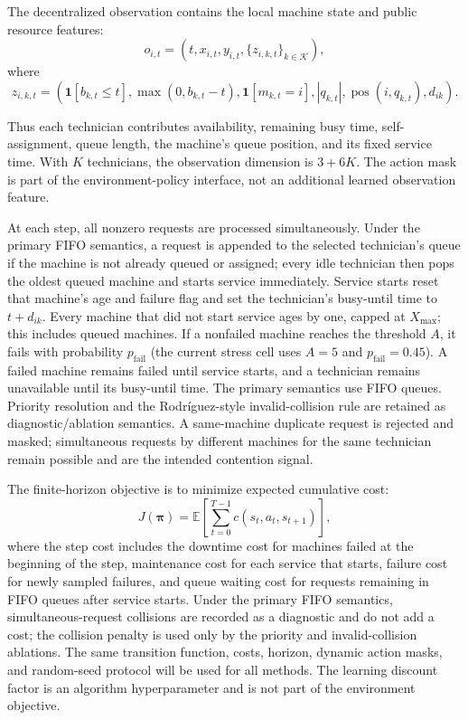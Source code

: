 \documentclass[11pt]{article}
\begin{document}
The decentralized observation contains the local machine state and public resource features:
\begin{equation}
    o_{i,t}=\left(t,x_{i,t},y_{i,t},
    \{z_{i,k,t}\}_{k\in\mathcal{K}}\right),
\end{equation}
where
\begin{equation}
    z_{i,k,t}=\left(\mathbf{1}[b_{k,t}\leq t],
    \max(0,b_{k,t}-t),
    \mathbf{1}[m_{k,t}=i],
    |q_{k,t}|,
    \operatorname{pos}(i,q_{k,t}),
    d_{ik}\right).
\end{equation}

Thus each technician contributes availability, remaining busy time, self-assignment, queue length, the machine's queue position, and its fixed service time. With $K$ technicians, the observation dimension is $3+6K$. The action mask is part of the environment-policy interface, not an additional learned observation feature.

At each step, all nonzero requests are processed simultaneously. Under the primary FIFO semantics, a request is appended to the selected technician's queue if the machine is not already queued or assigned; every idle technician then pops the oldest queued machine and starts service immediately. Service starts reset that machine's age and failure flag and set the technician's busy-until time to $t+d_{ik}$. Every machine that did not start service ages by one, capped at $X_{\max}$; this includes queued machines. If a nonfailed machine reaches the threshold $A$, it fails with probability $p_{\mathrm{fail}}$ (the current stress cell uses $A=5$ and $p_{\mathrm{fail}}=0.45$). A failed machine remains failed until service starts, and a technician remains unavailable until its busy-until time. The primary semantics use FIFO queues. Priority resolution and the Rodríguez-style invalid-collision rule are retained as diagnostic/ablation semantics. A same-machine duplicate request is rejected and masked; simultaneous requests by different machines for the same technician remain possible and are the intended contention signal.

The finite-horizon objective is to minimize expected cumulative cost:
\begin{equation}
    J(\boldsymbol{\pi}) = \mathbb{E}\left[\sum_{t=0}^{T-1} c(s_t,a_t,s_{t+1})\right],
\end{equation}
where the step cost includes the downtime cost for machines failed at the beginning of the step, maintenance cost for each service that starts, failure cost for newly sampled failures, and queue waiting cost for requests remaining in FIFO queues after service starts. Under the primary FIFO semantics, simultaneous-request collisions are recorded as a diagnostic and do not add a cost; the collision penalty is used only by the priority and invalid-collision ablations. The same transition function, costs, horizon, dynamic action masks, and random-seed protocol will be used for all methods. The learning discount factor is an algorithm hyperparameter and is not part of the environment objective.
\end{document}
